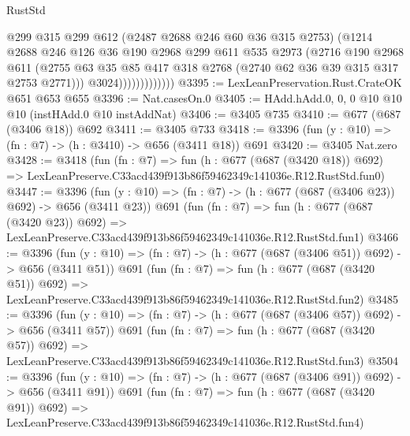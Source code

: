 \begin{lexlean}{RustStd}
\begin{coremodule}
                            @299
                            @315
                            @299
                            @612
                            (@2487 @2688 @246 @60 @36 @315 @2753)
                            (@1214
                              @2688
                              @246
                              @126
                              @36
                              @190
                              @2968
                              @299
                              @611
                              @535
                              @2973
                              (@2716
                                @190
                                @2968
                                @611
                                (@2755
                                  @63
                                  @35
                                  @85
                                  @417
                                  @318
                                  @2768
                                  (@2740 @62 @36 @39 @315 @317 @2753 @2771)))
                              @3024)))))))))))))
@3395 := LexLeanPreservation.Rust.CrateOK @651 @653 @655
@3396 := Nat.casesOn.{0}
@3405 := HAdd.hAdd.{0, 0, 0} @10 @10 @10 (instHAdd.{0} @10 instAddNat)
@3406 := @3405 @735
@3410 := @677 (@687 (@3406 @18)) @692
@3411 := @3405 @733
@3418 := @3396 (fun (y : @10) => (fn : @7) -> (h : @3410) -> @656 (@3411 @18)) @691
@3420 := @3405 Nat.zero
@3428 := @3418
    (fun (fn : @7) =>
    fun (h : @677 (@687 (@3420 @18)) @692) =>
    LexLeanPreserve.C33acd439f913b86f59462349c141036e.R12.RustStd.fun0)
@3447 := @3396
    (fun (y : @10) => (fn : @7) -> (h : @677 (@687 (@3406 @23)) @692) -> @656 (@3411 @23))
    @691
    (fun (fn : @7) =>
    fun (h : @677 (@687 (@3420 @23)) @692) =>
    LexLeanPreserve.C33acd439f913b86f59462349c141036e.R12.RustStd.fun1)
@3466 := @3396
    (fun (y : @10) => (fn : @7) -> (h : @677 (@687 (@3406 @51)) @692) -> @656 (@3411 @51))
    @691
    (fun (fn : @7) =>
    fun (h : @677 (@687 (@3420 @51)) @692) =>
    LexLeanPreserve.C33acd439f913b86f59462349c141036e.R12.RustStd.fun2)
@3485 := @3396
    (fun (y : @10) => (fn : @7) -> (h : @677 (@687 (@3406 @57)) @692) -> @656 (@3411 @57))
    @691
    (fun (fn : @7) =>
    fun (h : @677 (@687 (@3420 @57)) @692) =>
    LexLeanPreserve.C33acd439f913b86f59462349c141036e.R12.RustStd.fun3)
@3504 := @3396
    (fun (y : @10) => (fn : @7) -> (h : @677 (@687 (@3406 @91)) @692) -> @656 (@3411 @91))
    @691
    (fun (fn : @7) =>
    fun (h : @677 (@687 (@3420 @91)) @692) =>
    LexLeanPreserve.C33acd439f913b86f59462349c141036e.R12.RustStd.fun4)

\end{coremodule}
\end{lexlean}
